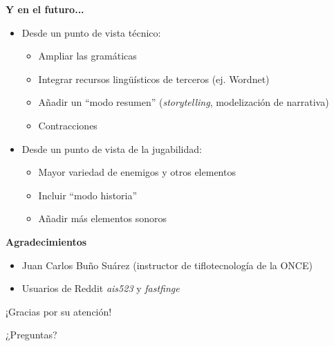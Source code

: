 \begin{tframe}{\textbf{Y en el futuro...}}
	\begin{itemize}
		\item Desde un punto de vista técnico:
			\begin{itemize}
				\item Ampliar las gramáticas
				\item Integrar recursos lingüísticos de terceros (ej. Wordnet)
				\item Añadir un ``modo resumen'' (\textit{storytelling}, modelización de narrativa)
				\item Contracciones
			\end{itemize}
		\item<+-| alert@+> Desde un punto de vista de la jugabilidad:
			\begin{itemize}
				\item Mayor variedad de enemigos y otros elementos
				\item Incluir ``modo historia''
				\item Añadir más elementos sonoros
			\end{itemize}
	\end{itemize}
\end{tframe}

\begin{tframe}{\textbf{Agradecimientos}}
	\begin{itemize}
		\item Juan Carlos Buño Suárez (instructor de tiflotecnología de la ONCE)
		\item Usuarios de Reddit \textit{ais523} y \textit{fastfinge}
	\end{itemize}
\end{tframe}


\begin{frame}[c]{}
	\begin{center}
		\Huge ¡Gracias por su atención!
	\end{center}
\end{frame}

\begin{frame}[c]{}
	\begin{center}
		\Huge ¿Preguntas?
	\end{center}
\end{frame}